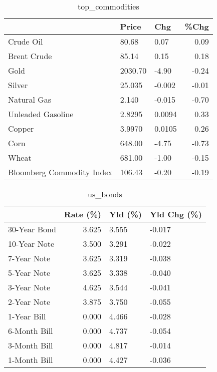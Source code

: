 \documentclass{article}%
\begin{document}
\begin{table}[htbp]%
\caption{top\_commodities}%
\centering%
\begin{adjustbox}{width=1\textwidth}%
\begin{tabular}{lllr}
\toprule
                          &   Price &    Chg &  \%Chg \\
\midrule
               Crude Oil  &   80.68 &   0.07 &  0.09 \\
             Brent Crude  &   85.14 &   0.15 &  0.18 \\
                    Gold  & 2030.70 &  -4.90 & -0.24 \\
                  Silver  &  25.035 & -0.002 & -0.01 \\
             Natural Gas  &   2.140 & -0.015 & -0.70 \\
       Unleaded Gasoline  &  2.8295 & 0.0094 &  0.33 \\
                  Copper  &  3.9970 & 0.0105 &  0.26 \\
                    Corn  &  648.00 &  -4.75 & -0.73 \\
                   Wheat  &  681.00 &  -1.00 & -0.15 \\
Bloomberg Commodity Index &  106.43 &  -0.20 & -0.19 \\
\bottomrule
\end{tabular}
%
\end{adjustbox}%
\end{table}

%


\begin{table}[htbp]%
\caption{us\_bonds}%
\centering%
\begin{adjustbox}{width=1\textwidth}%
\begin{tabular}{lrll}
\toprule
             &  Rate (\%) & Yld (\%) & Yld Chg (\%) \\
\midrule
30-Year Bond &     3.625 &   3.555 &      -0.017 \\
10-Year Note &     3.500 &   3.291 &      -0.022 \\
 7-Year Note &     3.625 &   3.319 &      -0.038 \\
 5-Year Note &     3.625 &   3.338 &      -0.040 \\
 3-Year Note &     4.625 &   3.544 &      -0.041 \\
 2-Year Note &     3.875 &   3.750 &      -0.055 \\
 1-Year Bill &     0.000 &   4.466 &      -0.028 \\
6-Month Bill &     0.000 &   4.737 &      -0.054 \\
3-Month Bill &     0.000 &   4.817 &      -0.014 \\
1-Month Bill &     0.000 &   4.427 &      -0.036 \\
\bottomrule
\end{tabular}
%
\end{adjustbox}%
\end{table}
\end{document}
